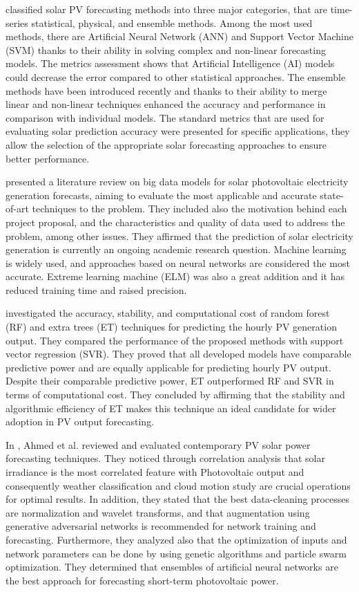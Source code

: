 \cite{SOBRI2018459} classified solar PV forecasting methods into three major categories, that are time-series statistical, physical, and ensemble methods.
Among the most used methods, there are Artificial Neural Network (ANN) and Support Vector Machine (SVM) thanks to their ability in solving complex and non-linear forecasting models.
The metrics assessment shows that Artificial Intelligence (AI) models could decrease the error compared to other statistical approaches.
The ensemble methods have been introduced recently and thanks to their ability to merge linear and non-linear techniques enhanced the accuracy and performance in comparison with individual models.
The standard metrics that are used for evaluating solar prediction accuracy were presented for specific applications, they allow the selection of the appropriate solar forecasting approaches to ensure better performance.

\cite{DEFREITASVISCONDI201954} presented a literature review on big data models for solar photovoltaic electricity generation forecasts, aiming to evaluate the most applicable and accurate state-of-art techniques to the problem.
They included also the motivation behind each project proposal, and the characteristics and quality of data used to address the problem, among other issues.
They affirmed that the prediction of solar electricity generation is currently an ongoing academic research question.
Machine learning is widely used, and approaches based on neural networks are considered the most accurate.
Extreme learning machine (ELM) was also a great addition and it has reduced training time and raised precision.

\cite{AHMAD2018465} investigated the accuracy, stability, and computational cost of random forest (RF) and extra trees (ET) techniques for predicting the hourly PV generation output.
They compared the performance of the proposed methods with support vector regression (SVR).
They proved that all developed models have comparable predictive power and are equally applicable for predicting hourly PV output.
Despite their comparable predictive power, ET outperformed RF and SVR in terms of computational cost.
They concluded by affirming that the stability and algorithmic efficiency of ET makes this technique an ideal candidate for wider adoption in PV output forecasting.

In \cite{AHMED2020109792}, Ahmed et al. reviewed and evaluated contemporary PV solar power forecasting techniques.
They noticed through correlation analysis that solar irradiance is the most correlated feature with Photovoltaic output and consequently weather classification and cloud motion study are crucial operations for optimal results.
In addition, they stated that the best data-cleaning processes are normalization and wavelet transforms, and that augmentation using generative adversarial networks is recommended for network training and forecasting.
Furthermore, they analyzed also that the optimization of inputs and network parameters can be done by using genetic algorithms and particle swarm optimization.
They determined that ensembles of artificial neural networks are the best approach for forecasting short-term photovoltaic power.

